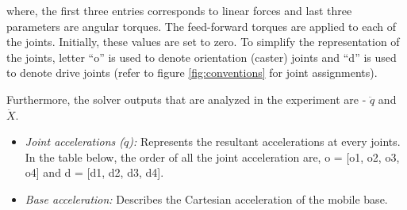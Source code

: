 where, the first three entries corresponds to linear forces and last three parameters are angular torques. The feed-forward torques are applied to each of the joints. Initially, these values are set to zero. To simplify the representation of the joints, letter ``o'' is used to denote orientation (caster) joints and ``d'' is used to denote drive joints (refer to figure \ref{fig:conventions} for joint assignments). 

Furthermore, the solver outputs that are analyzed in the experiment are - $\ddot{q}$ and $\ddot{X}$. 
\begin{itemize}
	\item \textit{Joint accelerations ($\ddot{q}$):} Represents the resultant accelerations at every joints. In the table below, the order of all the joint acceleration are, o = [o1, o2, o3, o4] and d = [d1, d2, d3, d4]. 
	\item \textit{Base acceleration:} Describes the Cartesian acceleration of the mobile base.
\end{itemize} 

